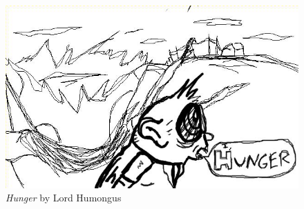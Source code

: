 
\begin{figure}[b]
  
  \includegraphics[width=\textwidth]{art/Lord_Humongus-Hungry.png}
  \caption{{\em Hunger} by Lord Humongus}
  
\end{figure}

